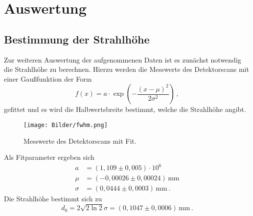 \section{Auswertung}
\subsection{Bestimmung der Strahlhöhe}
Zur weiteren Auswertung der aufgenommenen Daten ist es zunächst notwendig die Strahlhöhe zu berechnen. Hierzu werden die Messwerte des Detektorscans mit einer Gaußfunktion der Form
\begin{equation}
  f(x)=a\cdot \exp\left(-\frac{(x-\mu)^2}{2\sigma^2}\right)\,,
\end{equation}
gefittet und es wird die Halbwertsbreite bestimmt, welche die Strahlhöhe angibt.
\begin{figure}[h]
  \centering
  \texttt{[image: Bilder/fwhm.png]}
  \caption{Messwerte des Detektorscans mit Fit.}
\end{figure}
Als Fitparameter ergeben sich
\begin{align}
a&=(1{,}109\pm0{,}005)\cdot10^6\nonumber\\
\mu&=(-0{,}00026\pm0{,}00024)\,\si{\mm}\nonumber\\
\sigma&=(0{,}0444\pm0{,}0003)\,\si{\mm}\,.
\end{align}
Die Strahlhöhe bestimmt sich zu
\begin{equation}
d_0=2\sqrt{2\ln2}\sigma=(0{,}1047\pm0{,}0006)\,\si{\mm}\,.
\end{equation}\\
